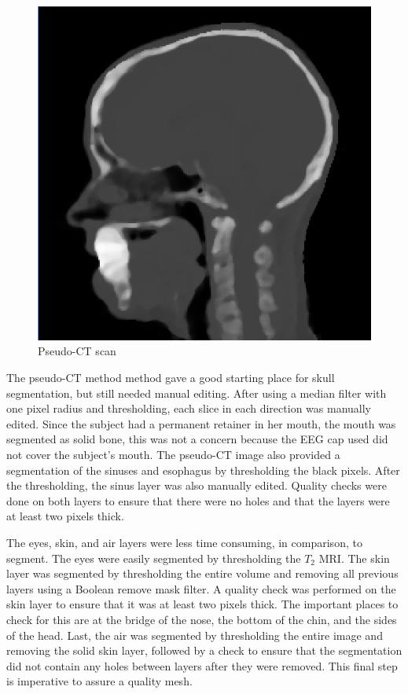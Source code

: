 \begin{figure}[H]
\begin{center}
\includegraphics[width=.75\textwidth]{Figures/pseudo_CT}
\caption{Pseudo-CT scan}
\label{fig:ct}
\end{center}
\end{figure}

The pseudo-CT method method gave a good starting place for skull segmentation, but still needed manual editing. After using a median filter with one pixel radius and thresholding, each slice in each direction was manually edited. Since the subject had a permanent retainer in her mouth, the mouth was segmented as solid bone, this was not a concern because the EEG cap used did not cover the subject's mouth. The pseudo-CT image also provided a segmentation of the sinuses and esophagus by thresholding the black pixels. After the thresholding, the sinus layer was also manually edited. Quality checks were done on both layers to ensure that there were no holes and that the layers were at least two pixels thick.

The eyes, skin, and air layers were less time consuming, in comparison, to segment. The eyes were easily segmented by thresholding the $T_2$ MRI. The skin layer was segmented by thresholding the entire volume and removing all previous layers using a Boolean remove mask filter. A quality check was performed on the skin layer to ensure that it was at least two pixels thick. The important places to check for this are at the bridge of the nose, the bottom of the chin, and the sides of the head. Last, the air was segmented by thresholding the entire image and removing the solid skin layer, followed by a check to ensure that the segmentation did not contain any holes between layers after they were removed. This final step is imperative to assure a quality mesh.

